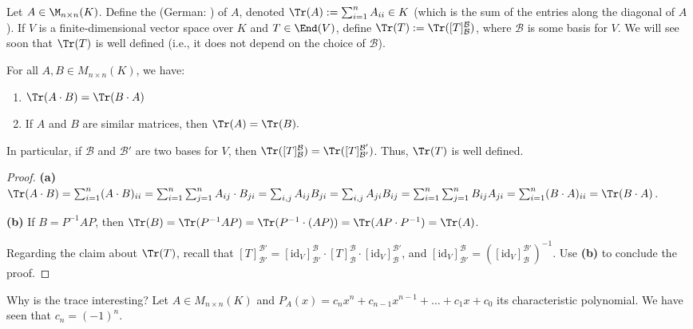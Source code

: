 \begin{definition}[Trace]\label{def:trace}
  Let $A \in \M_{n \times n}(K)$. Define the  (German: ) of $A$, denoted $\Tr(A) := \sum_{i=1}^n A_{ii} \in K$ (which is the sum of the entries along the diagonal of $A$).
  If $V$ is a finite-dimensional vector space over $K$ and $T \in \End(V)$, define $\Tr(T) := \Tr([T]_{\mathcal{B}}^{\mathcal{B}})$, where $\mathcal{B}$ is some basis for $V$. We will see soon that $\Tr(T)$ is well defined (i.e., it does not depend on the choice of $\mathcal{B}$).
\end{definition}

\begin{lemma}\label{lem:properties_trace}
  For all $A, B \in M_{n \times n}(K)$, we have:
  \begin{enumerate}
    \item[\textbf{(a)}] $\Tr(A \cdot B) = \Tr(B \cdot A)$
    \item[\textbf{(b)}] If $A$ and $B$ are similar matrices, then $\Tr(A) = \Tr(B).$
  \end{enumerate}
  In particular, if $\mathcal{B}$ and $\mathcal{B}'$ are two bases for $V$, then $\Tr([T]_{\mathcal{B}}^{\mathcal{B}}) = \Tr([T]_{\mathcal{B}'}^{\mathcal{B}'})$. Thus, $\Tr(T)$ is well defined.
\end{lemma}

\begin{proof}
  \textbf{(a)} $\Tr(A \cdot B) = \sum_{i=1}^n (A \cdot B)_{ii} = \sum_{i=1}^n \sum_{j=1}^n A_{ij} \cdot B_{ji} = \sum_{i,j} A_{ij}B_{ji} = \sum_{i,j} A_{ji}B_{ij} = \sum_{i=1}^n \sum_{j=1}^n B_{ij}A_{ji} = \sum_{i=1}^n (B \cdot A)_{ii} = \Tr(B \cdot A)$.

  \textbf{(b)} If $B = P^{-1}AP$, then $\Tr(B) = \Tr(P^{-1}AP) = \Tr(P^{-1} \cdot (AP)) = \Tr(AP \cdot P^{-1}) = \Tr(A)$.

  Regarding the claim about $\Tr(T)$, recall that $[T]_{\mathcal{B}'}^{\mathcal{B}'} = [\mathrm{id}_V]_{\mathcal{B}'}^{\mathcal{B}} \cdot [T]_{\mathcal{B}}^{\mathcal{B}} \cdot [\mathrm{id}_V]_{\mathcal{B}}^{\mathcal{B}'}$, and $[\mathrm{id}_V]_{\mathcal{B}'}^{\mathcal{B}} = ([\mathrm{id}_V]_{\mathcal{B}}^{\mathcal{B}'})^{-1}$. Use \textbf{(b)} to conclude the proof.
\end{proof}

Why is the trace interesting?
Let $A \in M_{n \times n}(K)$ and $P_A(x) = c_n x^n + c_{n-1} x^{n-1} + \dots + c_1 x + c_0$ its characteristic polynomial. We have seen that $c_n = (-1)^n$.

